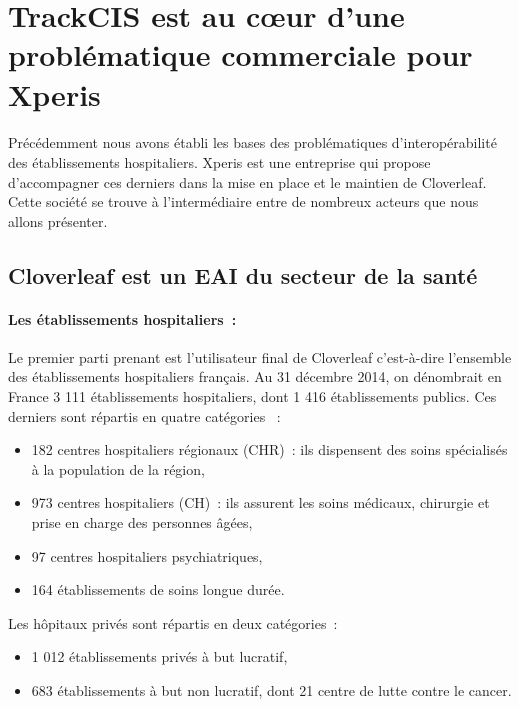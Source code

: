 	\section{TrackCIS est au cœur d'une problématique commerciale pour Xperis}
		\paragraph{}
		Précédemment nous avons établi les bases des problématiques d'interopérabilité
		des établissements hospitaliers. Xperis est une entreprise qui propose
		d'accompagner ces derniers dans la mise en place et le maintien de Cloverleaf.
		Cette société se trouve à l'intermédiaire entre de nombreux acteurs que nous
		allons présenter.
		
		\subsection{Cloverleaf est un EAI du secteur de la santé}
			\paragraph{Les établissements hospitaliers~:}%
			Le premier parti prenant est l'utilisateur final de
			Cloverleaf c'est-à-dire l'ensemble des établissements hospitaliers
			français.
			Au 31 décembre 2014, on dénombrait en France 3 111 établissements hospitaliers,
			dont 1 416 établissements publics. Ces derniers sont répartis en quatre
			catégories \citep{drees_panoramas_2016}~:
			\begin{itemize}
				\item 182 centres hospitaliers régionaux (CHR)~: ils dispensent des soins 
				spécialisés à la population de la région,
				\item 973 centres hospitaliers (CH)~: ils assurent les soins médicaux, 
				chirurgie et prise en charge des personnes âgées,
				\item 97 centres hospitaliers psychiatriques,
				\item 164 établissements de soins longue durée.
			\end{itemize}
			Les hôpitaux privés sont répartis en deux catégories~:
			\begin{itemize}
				\item 1 012 établissements privés à but lucratif,
				\item 683 établissements à but non lucratif, dont 21 centre de lutte contre 
				le cancer.
			\end{itemize}
			
